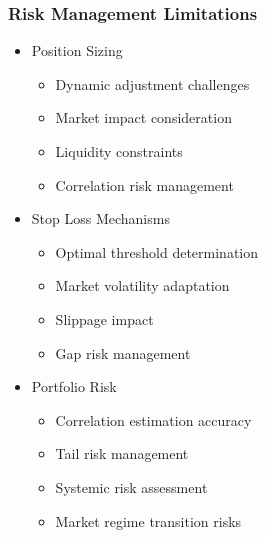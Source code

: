 \documentclass[conference]{IEEEtran}
\begin{document}
\subsubsection{Risk Management Limitations}
\begin{itemize}
    \item Position Sizing
    \begin{itemize}
        \item Dynamic adjustment challenges
        \item Market impact consideration
        \item Liquidity constraints
        \item Correlation risk management
    \end{itemize}
    
    \item Stop Loss Mechanisms
    \begin{itemize}
        \item Optimal threshold determination
        \item Market volatility adaptation
        \item Slippage impact
        \item Gap risk management
    \end{itemize}
    
    \item Portfolio Risk
    \begin{itemize}
        \item Correlation estimation accuracy
        \item Tail risk management
        \item Systemic risk assessment
        \item Market regime transition risks
    \end{itemize}
\end{itemize}
\end{document}
